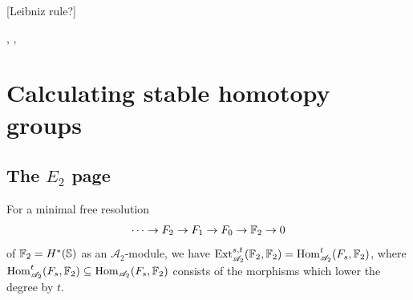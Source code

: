 \documentclass{MetricNotes2023}
\def\bb{\ensuremath\mathbb}
\def\subq{\ensuremath\subseteq}
\def\A{\ensuremath{\mathscr{A}_2}}
\DeclareMathOperator{\Ext}{Ext}
\DeclareMathOperator{\Hom}{Hom}
\begin{document}
[Leibniz rule?]










\autocite{ass}, \autocite{rognes2}, \autocite{spectra}

\section{Calculating stable homotopy groups}

\subsection{The \(E_2\) page}

\begin{lemma}\label{2503171645shutupitsbeenalongterm}
For a minimal free resolution 
\[\cdots \to F_2 \to F_1 \to F_0 \to \bb{F}_2 \to 0\]
of \(\bb{F}_2=H^*(\bb{S})\) as an \(\A\)-module, we have \(\Ext_{\A}^{s,t}(\bb{F}_2, \bb{F}_2)=\Hom^t_{\A}(F_s, \bb{F}_2)\), where \(\Hom^t_{\A}(F_s, \bb{F}_2)\subq \Hom_{\A}(F_s, \bb{F}_2)\) consists of the morphisms which lower the degree by \(t\).
\end{lemma}
\end{document}
